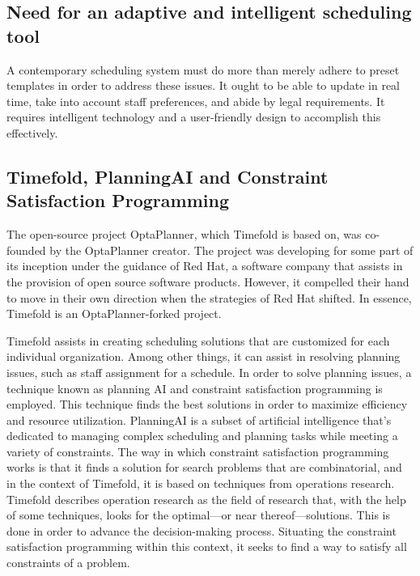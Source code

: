 \documentclass[nomenclature, english, bibtex]{kththesis}
\begin{document}
\subsection{Need for an adaptive and intelligent scheduling tool}
A contemporary scheduling system must do more than merely adhere to preset templates in order to address these issues.  It ought to be able to update in real time, take into account staff preferences, and abide by legal requirements. It requires intelligent technology and a user-friendly design to accomplish this effectively. \cite{Ernst_researchgate} \cite{ohlund2025}

\subsection{Timefold, PlanningAI and Constraint Satisfaction Programming}
The open-source project OptaPlanner, which Timefold is based on, was co-founded by the OptaPlanner creator. The project was developing for some part of its inception under the guidance of Red Hat, a software company that assists in the provision of open source software products. However, it compelled their hand to move in their own direction when the strategies of Red Hat shifted. In essence, Timefold is an OptaPlanner-forked project. \cite{red_hat} \cite{timefold_optaplanner} 

Timefold assists in creating scheduling solutions that are customized for each individual organization.  Among other things, it can assist in resolving planning issues, such as staff assignment for a schedule.  In order to solve planning issues, a technique known as planning AI and constraint satisfaction programming is employed. This technique finds the best solutions in order to maximize efficiency and resource utilization. \cite{timefold_documentation_introduction} PlanningAI is a subset of artificial intelligence that's dedicated to managing complex scheduling and planning tasks while meeting a variety of constraints. The way in which constraint satisfaction programming works is that it finds a solution for search problems that are combinatorial, and in the context of Timefold, it is based on techniques from operations research. \cite{ROSSI2008181} Timefold describes operation research as the field of research that, with the help of some techniques, looks for the optimal—or near thereof—solutions. This is done in order to advance the decision-making process. Situating the constraint satisfaction programming within this context, it seeks to find a way to satisfy all constraints of a problem. \cite{timefold_planning_ai_concepts}
\end{document}
